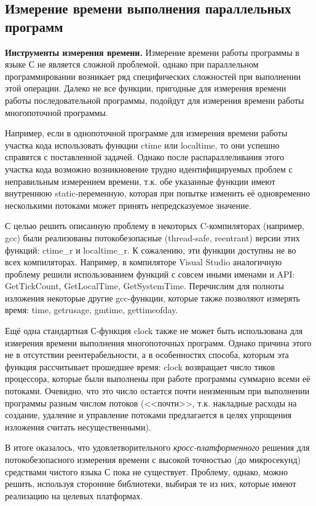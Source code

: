 \subsection{Измерение времени выполнения параллельных программ}

\textbf{Инструменты измерения времени.} Измерение времени работы программы в языке С не является сложной проблемой, однако при параллельном программировании возникает ряд специфических сложностей при выполнении этой операции. Далеко не все функции, пригодные для измерения времени работы последовательной программы, подойдут для измерения времени работы многопоточной программы. 

Например, если в однопоточной программе для измерения времени работы участка кода использовать функции ctime или localtime, то они успешно справятся с поставленной задачей. Однако после распараллеливания этого участка кода возможно возникновение трудно идентифицируемых проблем с неправильным измерением времени, т.к. обе указанные функции имеют внутреннюю static-переменную, которая при попытке изменить её одновременно несколькими потоками может принять непредсказуемое значение.

С целью решить описанную проблему в некоторых C-компиляторах (например, gcc) были реализованы потокобезопасные (thread-safe, reen\-trant) версии этих функций: ctime\_r и localtime\_r. К сожалению, эти функции доступны не во всех компиляторах. Например, в компиляторе Visual Studio аналогичную проблему решили использованием функций с совсем иными именами и API: Get\-Tick\-Count, Get\-Local\-Time, Get\-System\-Time. Перечислим для полноты изложения некоторые другие gcc-функции, которые также позволяют измерять время: time, get\-r\-usage, gm\-time, get\-time\-of\-day.

Ещё одна стандартная С-функция clock также не может быть использована для измерения времени выполнения многопоточных программ. Однако причина этого не в отсутствии реентерабельности, а в особенностях способа, которым эта функция рассчитывает прошедшее время: clock возвращает число тиков процессора, которые были выполнены при работе программы суммарно всеми её потоками. Очевидно, что это число остается почти неизменным при выполнении программы разным числом потоков (<<почти>>, т.к. накладные расходы на создание, удаление и управление потоками предлагается в целях упрощения изложения считать несущественными).

В итоге оказалось, что удовлетворительного \textit{кросс-платформенного} решения для потокобезопасного измерения времени с высокой точностью (до микросекунд) средствами чистого языка С пока не существует. Проблему, однако, можно решить, используя сторонние библиотеки, выбирая те из них, которые имеют реализацию на целевых платформах.

